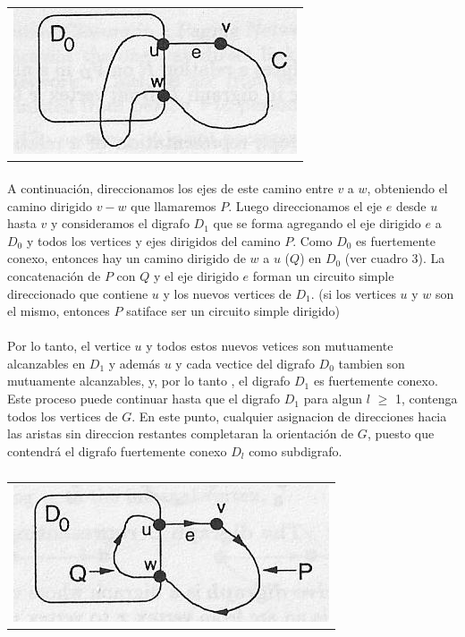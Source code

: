	\begin{table}[h!] %
		\centering %
			\begin{tabular}{c}
				\includegraphics[scale=0.7]{./figura2.jpg} 

				\end{tabular}
				\caption{} %
				\label{} %
	\end{table}

\paragraph{}
A continuación, direccionamos los ejes de este camino entre $v$ a $w$, obteniendo el camino dirigido $v-w$ que llamaremos $P$. Luego direccionamos el eje $e$ desde $u$ hasta $v$ y consideramos el digrafo $D_1$ que se forma agregando el eje dirigido $e$ a $D_0$ y todos los vertices y ejes dirigidos del camino $P$. Como $D_0$ es fuertemente conexo, entonces hay un camino dirigido de $w$ a $u$ ($Q$) en $D_0$ (ver cuadro 3). La concatenación de $P$ con $Q$ y el eje dirigido $e$ forman un circuito simple direccionado que contiene $u$ y los nuevos vertices de $D_1$. (si los vertices $u$ y $w$ son el mismo, entonces $P$ satiface ser un circuito simple dirigido)



\paragraph{}
Por lo tanto, el vertice $u$ y todos estos nuevos vetices son mutuamente alcanzables en $D_1$ y además $u$ y cada vectice del digrafo $D_0$ tambien son mutuamente alcanzables, y, por lo tanto , el digrafo $D_1$ es fuertemente conexo. Este proceso puede continuar hasta que el digrafo $D_1$ para algun $l$ $\geq$ 1, contenga todos los vertices de $G$. En este punto, cualquier asignacion de direcciones hacia las aristas sin direccion restantes completaran la orientación de $G$, puesto que contendrá el digrafo fuertemente conexo $D_l$ como subdigrafo.



	\begin{table}[h!] %
		\centering %
			\begin{tabular}{c}
				\includegraphics[scale=0.7]{./figura3.jpg} 

				\end{tabular}
				\caption{} %
				\label{} %
	\end{table}

